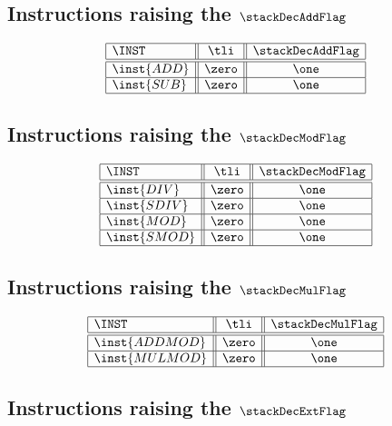 \iffalse

\subsection{Instructions raising the $\stackDecAddFlag$}
\label{hub: instruction handling: Add}

\[
\begin{array}{|l||c||c|}
	\hline
	\INST		& \tli	& \stackDecAddFlag	\\ \hline\hline
	\inst{ADD}	& \zero	& \one			\\ \hline
	\inst{SUB}	& \zero	& \one			\\ \hline
\end{array}
\]

\subsection{Instructions raising the $\stackDecModFlag$}
\label{hub: instruction handling: Mod}

\[
\begin{array}{|l||c||c|}
	\hline
	\INST		& \tli	& \stackDecModFlag	\\ \hline\hline
	\inst{DIV}	& \zero & \one			\\ \hline
	\inst{SDIV}	& \zero & \one			\\ \hline
	\inst{MOD}	& \zero & \one			\\ \hline
	\inst{SMOD}	& \zero & \one			\\ \hline
\end{array}
\]

\subsection{Instructions raising the $\stackDecMulFlag$}
\label{hub: instruction handling: Mul}

\[
\begin{array}{|l||c||c|}
	\hline
	\INST			& \tli	& \stackDecMulFlag	\\ \hline\hline
	\inst{ADDMOD}	& \zero	& \one			\\ \hline
	\inst{MULMOD}	& \zero	& \one			\\ \hline
\end{array}
\]

\subsection{Instructions raising the $\stackDecExtFlag$}
\label{hub: instruction handling: Ext}

